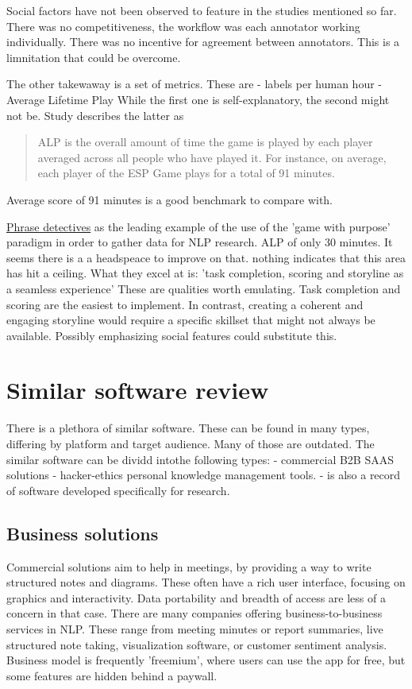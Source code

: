 \documentclass{article}
\begin{document}
Social factors have not been observed to feature in the studies mentioned so far.
There was no competitiveness, the workflow was each annotator working individually.
There was no incentive for agreement between annotators.
This is a limnitation that could be overcome.

The other takewaway is a set of metrics. These are
- labels per human hour
- Average Lifetime Play
While the first one is self-explanatory, the second might not be.
Study describes the latter as 
\begin{quote}
 ALP is the overall amount of time the game is played by each player averaged across all people who have played it. For instance, on average, each player of the ESP Game plays for a total of 91 minutes.
\end{quote}
Average score of 91 minutes is a good benchmark to compare with.

\href{https://dl.acm.org/doi/10.1145/2448116.2448119}{Phrase detectives} as the leading example of the use of the 'game with purpose' paradigm in order to gather data for NLP research.
ALP of only 30 minutes. It seems there is a a headspeace to improve on that. nothing indicates that this area has hit a ceiling.
What they excel at is: 'task completion, scoring and storyline as a seamless experience'
These are qualities worth emulating. Task completion and scoring are the easiest to implement. 
In contrast, creating a coherent and engaging storyline would require a specific skillset that might not always be available.
Possibly emphasizing social features could substitute this.

\section{Similar software review}
There is a plethora of similar software. These can be found in many types, differing by platform and target audience. Many of those are outdated.
The similar software can be dividd intothe following types:
- commercial B2B SAAS solutions
- hacker-ethics personal knowledge management tools.
- is also a record of software developed specifically for research.

\subsection{Business solutions}
Commercial solutions aim to help in meetings, by providing a way to write structured notes and diagrams. These often have a rich user interface, focusing on graphics and interactivity.
Data portability and breadth of access are less of a concern in that case.
There are many companies offering business-to-business services in NLP.  These range from meeting minutes or report summaries, live structured note taking, visualization software, or customer sentiment analysis.  Business model is frequently 'freemium', where users can use the app for free, but some features are hidden behind a paywall.
\end{document}
